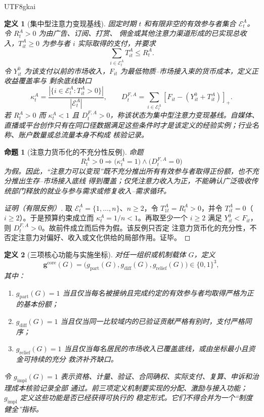 \documentclass[12pt,a4paper,openany]{report}
\newtheorem{definition}{定义}[chapter]
\newtheorem{proposition}{命题}[chapter]
\newcommand{\Abs}[1]{\left\lvert #1\right\rvert}
\begin{document}
\begin{CJK*}{UTF8}{gkai}
\begin{definition}[集中型注意力变现基线]
固定时期 \(t\) 和有限非空的有效参与者集合 \(\mathcal E_t^A\)。令 \(R_t^A>0\) 为由广告、订阅、打赏、
佣金或其他注意力渠道形成的已实现总收入，\(T_{it}^A\ge0\) 为参与者 \(i\) 实际取得的支付，并要求
\[
  \sum_{i\in\mathcal E_t^A}T_{it}^A\le R_t^A.
\]
令 \(Y_{it}^{0}\) 为该支付以前的市场收入，\(F_{it}\) 为最低物质--市场接入束的货币成本，定义正收益覆盖率与
剩余底线缺口
\[
  \kappa_t^A
  =\frac{\Abs{\{i\in\mathcal E_t^A:T_{it}^A>0\}}}
  {\Abs{\mathcal E_t^A}},
  \qquad
  D_t^{F,A}
  =\sum_{i\in\mathcal E_t^A}
  [F_{it}-(Y_{it}^{0}+T_{it}^A)]_+.
\]
若 \(R_t^A>0\) 而 \(\kappa_t^A<1\) 且 \(D_t^{F,A}>0\)，称该状态为集中型注意力变现基线。自媒体、
直播或平台创作只有在同口径数据满足这些条件时才是该定义的经验实例；行业名称、账户数量或总流量本身不构成
核验记录。
\end{definition}

\begin{proposition}[注意力货币化的不充分性反例]
\label{prop:attention-monetization-insufficient}
命题
\[
  R_t^A>0
  \Longrightarrow
  \bigl(\kappa_t^A=1\bigr)
  \wedge
  \bigl(D_t^{F,A}=0\bigr)
\]
为假。因此，“注意力可以变现”既不充分推出所有有效参与者取得正份额，也不充分推出生存--市场接入底线
得到覆盖；仅凭注意力收入为正，不能确认广泛吸收传统部门释放的就业与参与需求或修复收入--需求循环。
\end{proposition}

\begin{proof}[证明（有限反例）]
取 \(\mathcal E_t^A=\{1,\ldots,n\}\)、\(n\ge2\)，令 \(T_{1t}^A=R_t^A>0\)，并令
\(T_{it}^A=0\)（\(i\ge2\)）。于是预算约束成立而 \(\kappa_t^A=1/n<1\)。再取至少一个
\(i\ge2\) 满足 \(Y_{it}^{0}<F_{it}\)，则 \(D_t^{F,A}>0\)。故前件成立而后件为假。该反例只否定
注意力货币化的充分性，不否定注意力对偏好、收入或文化供给的局部作用。证毕。
\end{proof}

\begin{definition}[三项核心功能与实施坐标]
\label{def:three-core-functions}
对任一组织或机制载体 \(G\)，定义
\[
  \mathbf g^{\mathrm{core}}(G)
  =\bigl(g_{\mathrm{part}}(G),
  g_{\mathrm{diff}}(G),
  g_{\mathrm{relief}}(G)\bigr)\in\{0,1\}^3,
\]
其中：
\begin{enumerate}[label=\textnormal{(F\arabic*)},leftmargin=4em]
  \item \(g_{\mathrm{part}}(G)=1\) 当且仅当每名被接纳且完成约定的有效参与者均取得严格为正的基本份额；
  \item \(g_{\mathrm{diff}}(G)=1\) 当且仅当同一比较域内的已验证贡献严格有别时，支付严格同序；
  \item \(g_{\mathrm{relief}}(G)=1\) 当且仅当每名居民的市场收入已覆盖底线，或由坐标最小且资金可持续的充分
  救济补齐缺口。
\end{enumerate}
令 \(g_{\mathrm{impl}}(G)=1\) 表示资格、计量、验证、合同确权、实际支付、复算、申诉和治理成本核验记录全部
通过。前三项定义机制要实现的分配、激励与接入功能；\(g_{\mathrm{impl}}\) 定义这些功能是否已经获得可执行的
稳定形式。它们不得合并为一个“制度健全”指标。
\end{definition}


\end{CJK*}
\end{document}
